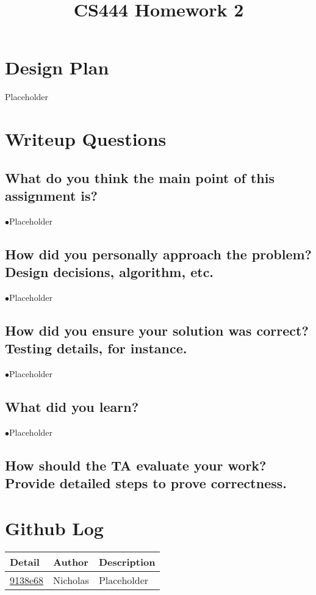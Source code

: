 \documentclass[letterpaper,10pt,fleqn,draftclsnofoot,onecolumn]{IEEEtran}
\title{CS444 Homework 2}
\author{\name}
\begin{document}
	\maketitle
	\hrulefill
	\section*{Design Plan}
	Placeholder
	
	\section*{Writeup Questions}
	
	\subsection{What do you think the main point of this assignment is?}
	$\bullet$Placeholder
	
	\subsection{How did you personally approach the problem? Design decisions, algorithm, etc.}
	$\bullet$Placeholder
	
	
	\subsection{How did you ensure your solution was correct? Testing details, for instance.}
	$\bullet$Placeholder
	
	\subsection{What did you learn?}
	$\bullet$Placeholder
	
	\subsection{How should the TA evaluate your work? Provide detailed steps to prove correctness.}
	 
	\section*{ Github Log }
	\begin{tabular}{l l p{1.5in}}\textbf{Detail} & \textbf{Author} & \textbf{Description}\\\hline
		\href{https://github.com/Skinnern/CS444/commit/9138e6857021329354027c49c35fea1604fd5585}{9138e68} & Nicholas & Placeholder\\\hline
	\end{tabular}
	
\end{document}
